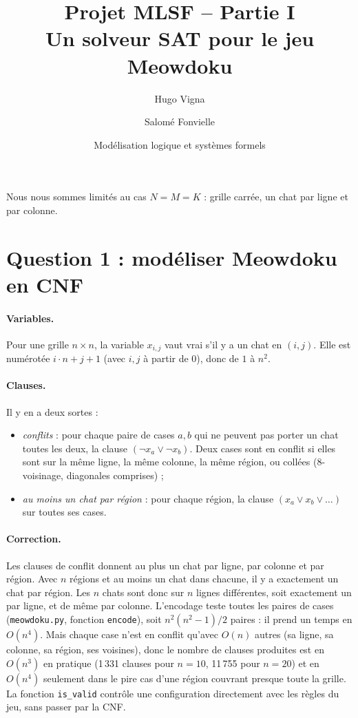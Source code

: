 \documentclass[11pt,a4paper]{article}
\title{Projet MLSF -- Partie I\\Un solveur SAT pour le jeu Meowdoku}
\author{Hugo Vigna \and Salomé Fonvielle}
\date{Modélisation logique et systèmes formels}
\newcommand{\f}[1]{\texttt{#1}}
\begin{document}
\maketitle

Nous nous sommes limités au cas $N=M=K$ : grille carrée, un chat par ligne et par colonne.

\section*{Question 1 : modéliser Meowdoku en CNF}

\paragraph{Variables.} Pour une grille $n\times n$, la variable $x_{i,j}$ vaut vrai s'il y a un chat en $(i,j)$. Elle est numérotée $i\cdot n+j+1$ (avec $i,j$ à partir de $0$), donc de $1$ à $n^2$.

\paragraph{Clauses.} Il y en a deux sortes :
\begin{itemize}
  \item \emph{conflits} : pour chaque paire de cases $a,b$ qui ne peuvent pas porter un chat toutes les deux, la clause $(\neg x_a\vee\neg x_b)$. Deux cases sont en conflit si elles sont sur la même ligne, la même colonne, la même région, ou collées (8-voisinage, diagonales comprises) ;
  \item \emph{au moins un chat par région} : pour chaque région, la clause $(x_a\vee x_b\vee\dots)$ sur toutes ses cases.
\end{itemize}

\paragraph{Correction.} Les clauses de conflit donnent au plus un chat par ligne, par colonne et par région. Avec $n$ régions et au moins un chat dans chacune, il y a exactement un chat par région. Les $n$ chats sont donc sur $n$ lignes différentes, soit exactement un par ligne, et de même par colonne. L'encodage teste toutes les paires de cases (\f{meowdoku.py}, fonction \f{encode}), soit $n^2(n^2-1)/2$ paires : il prend un temps en $O(n^4)$. Mais chaque case n'est en conflit qu'avec $O(n)$ autres (sa ligne, sa colonne, sa région, ses voisines), donc le nombre de clauses produites est en $O(n^3)$ en pratique (1\,331 clauses pour $n=10$, 11\,755 pour $n=20$) et en $O(n^4)$ seulement dans le pire cas d'une région couvrant presque toute la grille. La fonction \f{is\_valid} contrôle une configuration directement avec les règles du jeu, sans passer par la CNF.
\end{document}
